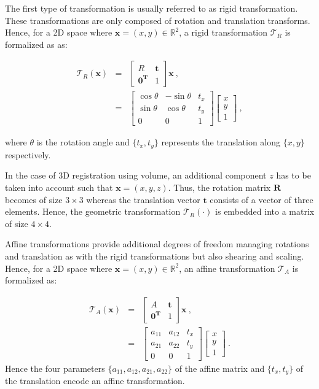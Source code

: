 The first type of transformation is usually referred to as rigid transformation.
These transformations are only composed of rotation and translation transforms.
Hence, for a 2D space where $\mathbf{x} = (x,y) \in \mathbb{R}^2$, a rigid transformation $\mathcal{T}_R$ is formalized as as:

\begin{eqnarray}
	\mathcal{T}_R(\mathbf{x}) & = & \begin{bmatrix}
		R & \mathbf{t} \\
		\mathbf{0^T} & 1
	\end{bmatrix} \mathbf{x} \ , \nonumber \\
	& = & \begin{bmatrix}
		\cos \theta & -\sin \theta & t_x \\
		\sin \theta & \cos \theta & t_y \\
		0 & 0 & 1
	\end{bmatrix}\begin{bmatrix}
		x \\
		y \\
		1
	\end{bmatrix} \ , \label{eq:rigtra} %
\end{eqnarray}

\noindent where $\theta$ is the rotation angle and $\{ t_x,t_y \}$ represents the translation along $\{x,y\}$ respectively.

In the case of 3D registration using volume, an additional component $z$ has to be taken into account such that $\mathbf{x} = (x,y,z)$.
Thus, the rotation matrix $\mathbf{R}$ becomes of size $3 \times 3$ whereas the translation vector $\mathbf{t}$ consists of a vector of three elements. 
Hence, the geometric transformation $\mathcal{T}_R(\cdot)$ is embedded into a matrix of size $4 \times 4$.

Affine transformations provide additional degrees of freedom managing rotations and translation as with the rigid transformations but also shearing and scaling.
Hence, for a 2D space where $\mathbf{x} = (x,y) \in \mathbb{R}^2$, an affine transformation $\mathcal{T}_A$ is formalized as: 

\begin{eqnarray}
	\mathcal{T}_A(\mathbf{x}) & = & \begin{bmatrix}
		A & \mathbf{t} \\
		\mathbf{0^T} & 1
	\end{bmatrix} \mathbf{x} \ , \nonumber \\
	& = & \begin{bmatrix}
		a_{11} & a_{12} & t_x \\
		a_{21} & a_{22} & t_y \\
		0 & 0 & 1
	\end{bmatrix}\begin{bmatrix}
		x \\
		y \\
		1
	\end{bmatrix} \ . \label{eq:afftra}%
\end{eqnarray}
\noindent Hence the four parameters $\{a_{11},a_{12},a_{21},a_{22}\}$ of the affine matrix and $\{ t_x, t_y \}$ of the translation encode an affine transformation.

